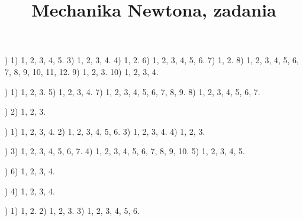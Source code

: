 \documentclass[a4paper,11pt]{article}
\title{Mechanika Newtona, zadania}
\begin{document}





\maketitle %







\noindent
{}) 1) 1, 2, 3, 4, 5. 3) 1, 2, 3, 4. 4) 1, 2. 6) 1, 2, 3,
4, 5, 6. 7) 1, 2. 8) 1, 2, 3, 4, 5, 6, 7, 8, 9, 10, 11, 12. 9) 1, 2,
3. 10) 1, 2, 3, 4.

\vspace{\spaceFour}



\noindent
{}) 1) 1, 2, 3. 5) 1, 2, 3, 4. 7) 1, 2, 3, 4, 5, 6, 7, 8,
9. 8) 1, 2, 3, 4, 5, 6, 7.



\noindent
{}) 2) 1, 2, 3.

\vspace{\spaceFour}



\noindent
{}) 1) 1, 2, 3, 4. 2) 1, 2, 3, 4, 5, 6. 3) 1, 2, 3, 4. 4)
1, 2, 3.

\vspace{\spaceFour}



\noindent
{}) 3) 1, 2, 3, 4, 5, 6, 7. 4) 1, 2, 3, 4, 5, 6, 7, 8, 9, 10.
5) 1, 2, 3, 4, 5.

\vspace{\spaceFour}



\noindent
{}) 6) 1, 2, 3, 4.

\vspace{\spaceFour}



\noindent
{}) 4) 1, 2, 3, 4.

\vspace{\spaceFour}



\noindent
{}) 1) 1, 2. 2) 1, 2, 3. 3) 1, 2, 3, 4, 5, 6.
\end{document}
